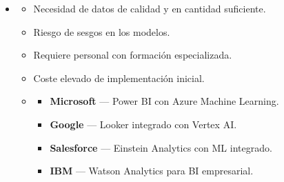 \begin{solution}
\begin{itemize}
		\item {}
		      \begin{itemize}
			      \item Necesidad de datos de calidad y en cantidad suficiente.
			      \item Riesgo de sesgos en los modelos.
			      \item Requiere personal con formación especializada.
			      \item Coste elevado de implementación inicial.
		      \end{itemize}

		      \begin{itemize}
			      \item {}
			            \begin{itemize}
				            \item \textbf{Microsoft} --- Power BI con Azure Machine Learning.
				            \item \textbf{Google} --- Looker integrado con Vertex AI.
				            \item \textbf{Salesforce} --- Einstein Analytics con ML integrado.
				            \item \textbf{IBM} --- Watson Analytics para BI empresarial.
			            \end{itemize}
		      \end{itemize}
	\end{itemize}

\end{solution}
